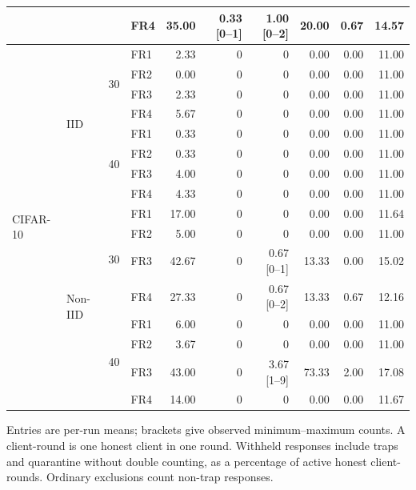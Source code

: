 \begin{table}[!t]
\begin{tabular}{llllrrrrrr}
 &  &  & FR4 & 35.00 & 0.33 [0--1] & 1.00 [0--2] & 20.00 & 0.67 & 14.57 \\
\midrule
\multirow{16}{*}{CIFAR-10} & \multirow{8}{*}{IID} & \multirow{4}{*}{30} & FR1 & 2.33 & 0 & 0 & 0.00 & 0.00 & 11.00 \\
 &  &  & FR2 & 0.00 & 0 & 0 & 0.00 & 0.00 & 11.00 \\
 &  &  & FR3 & 2.33 & 0 & 0 & 0.00 & 0.00 & 11.00 \\
 &  &  & FR4 & 5.67 & 0 & 0 & 0.00 & 0.00 & 11.00 \\
\cmidrule(lr){3-10}
 &  & \multirow{4}{*}{40} & FR1 & 0.33 & 0 & 0 & 0.00 & 0.00 & 11.00 \\
 &  &  & FR2 & 0.33 & 0 & 0 & 0.00 & 0.00 & 11.00 \\
 &  &  & FR3 & 4.00 & 0 & 0 & 0.00 & 0.00 & 11.00 \\
 &  &  & FR4 & 4.33 & 0 & 0 & 0.00 & 0.00 & 11.00 \\
\cmidrule(lr){2-10}
 & \multirow{8}{*}{Non-IID} & \multirow{4}{*}{30} & FR1 & 17.00 & 0 & 0 & 0.00 & 0.00 & 11.64 \\
 &  &  & FR2 & 5.00 & 0 & 0 & 0.00 & 0.00 & 11.00 \\
 &  &  & FR3 & 42.67 & 0 & 0.67 [0--1] & 13.33 & 0.00 & 15.02 \\
 &  &  & FR4 & 27.33 & 0 & 0.67 [0--2] & 13.33 & 0.67 & 12.16 \\
\cmidrule(lr){3-10}
 &  & \multirow{4}{*}{40} & FR1 & 6.00 & 0 & 0 & 0.00 & 0.00 & 11.00 \\
 &  &  & FR2 & 3.67 & 0 & 0 & 0.00 & 0.00 & 11.00 \\
 &  &  & FR3 & 43.00 & 0 & 3.67 [1--9] & 73.33 & 2.00 & 17.08 \\
 &  &  & FR4 & 14.00 & 0 & 0 & 0.00 & 0.00 & 11.67 \\
\bottomrule
\end{tabular}
\par\smallskip\parbox{0.97\textwidth}{\scriptsize Entries are per-run means; brackets give observed minimum--maximum counts. A client-round is one honest client in one round. Withheld responses include traps and quarantine without double counting, as a percentage of active honest client-rounds. Ordinary exclusions count non-trap responses.}
\end{table}
